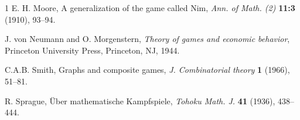 \documentclass[10pt]{article}
\theoremstyle{definition}
\begin{document}
\begin{thebibliography}{1}
E. H. Moore, A generalization of the game called Nim, 
{\it Ann. of Math. (2)} {\bf11:3} (1910), 93--94.

J. von Neumann and O. Morgenstern, 
{\it Theory of games and economic behavior}, 
Princeton University Press, Princeton, NJ, 1944.

C.A.B. Smith, Graphs and composite games,
{\it J. Combinatorial theory} {\bf1}  (1966), 51--81.

R. Sprague, \"{U}ber mathematische Kampfspiele, 
{\it Tohoku Math. J.} {\bf41} (1936), 438--444.

\end{thebibliography}
\end{document}
